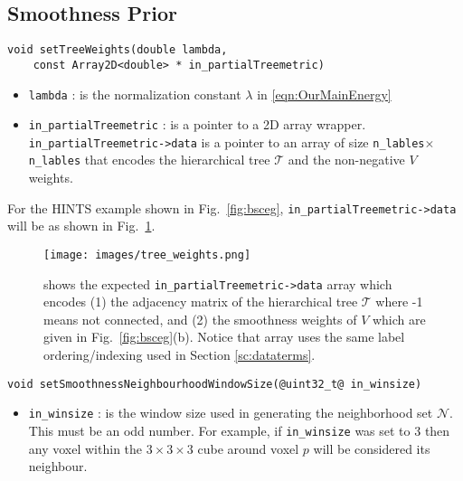 \documentclass[12pt,letterpaper]{article}
\def\Tree{\mathcal{T}}
\def\neighbset{\mathcal{N}}
\def\Tree{\mathcal{T}}
\begin{document}
\subsection{Smoothness Prior}
\begin{lstlisting}
void setTreeWeights(double lambda,
    const Array2D<double> * in_partialTreemetric)
\end{lstlisting}
\begin{itemize}
\item \lstinline{lambda} : is the normalization constant $\lambda$ in \eqref{eqn:OurMainEnergy}
\item \lstinline{in_partialTreemetric} : is a pointer to a 2D array wrapper. \lstinline{in_partialTreemetric->data} is a pointer to an array of size \lstinline{n_lables}$\times$\lstinline{n_lables} that encodes the hierarchical tree $\Tree$ and the non-negative $V$ weights.
\end{itemize}
For the HINTS example shown in Fig.~\ref{fig:bsceg}, \lstinline{in_partialTreemetric->data} will be as shown in Fig.~\ref{fig:eg_treeweights}.
\begin{figure}[h]
\centering
\texttt{[image: images/tree\_weights.png]}
\caption{shows the expected  \lstinline{in_partialTreemetric->data} array which encodes (1) the adjacency matrix of the hierarchical tree $\Tree$ where -1 means not connected, and (2) the smoothness weights of $V$ which are given in Fig.~\ref{fig:bsceg}(b). Notice that array uses the same label ordering/indexing used in Section \ref{sc:dataterms}.}
\label{fig:eg_treeweights}
\end{figure}

\begin{lstlisting}
void setSmoothnessNeighbourhoodWindowSize(@uint32_t@ in_winsize)
\end{lstlisting}
\begin{itemize}
\item \lstinline{in_winsize} : is the window size used in generating the neighborhood set $\neighbset$. This must be an odd number. For example, if \lstinline{in_winsize} was set to 3 then any voxel within the $3\times 3\times 3$ cube around voxel $p$ will be considered its neighbour.
\end{itemize}
\end{document}
